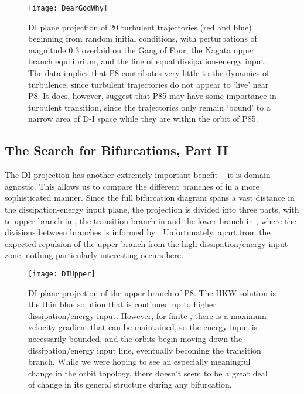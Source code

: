 \begin{figure}[h]
\texttt{[image: DearGodWhy]}
\caption{DI plane projection of 20 turbulent trajectories (red and blue) beginning from random initial conditions, with perturbations of magnitude $0.3$ overlaid on the Gang of Four, the Nagata upper branch equilibrium, and the line of equal dissipation-energy input. The data implies that P8 contributes very little to the dynamics of turbulence, since turbulent trajectories do not appear to `live' near P8. It does, however, suggest that P85 may have some importance in turbulent transition, since the trajectories only remain `bound' to a narrow area of D-I space while they are within the orbit of P85.}\label{fig:turbDI}
\end{figure}

\subsection{The Search for Bifurcations, Part II}
The DI projection has another extremely important benefit -- it is domain-agnostic. This allows us to compare the different branches of  in a more sophisticated manner. Since the full bifurcation diagram spans a vast distance in the dissipation-energy input plane, the projection is divided into three parts, with te upper branch in , the transition branch in  and the lower branch in , where the divisions between branches is informed by . Unfortunately, apart from the expected repulsion of the upper branch from the high dissipation/energy input zone, nothing particularly interesting occurs here.\\


\begin{figure}[h]
\texttt{[image: DIUpper]}
\caption{DI plane projection of the upper branch of P8. The HKW solution is the thin blue solution that is continued up to higher dissipation/energy input. However, for finite \ReN, there is a maximum velocity gradient that can be maintained, so the energy input is necessarily bounded, and the orbits begin moving down the dissipation/energy input line, eventually becoming the transition branch. While we were hoping to see an especially meaningful change in the orbit topology, there doesn't seem to be a great deal of change in its general structure during any bifurcation. }\label{fig:DIUpper}
\end{figure}

